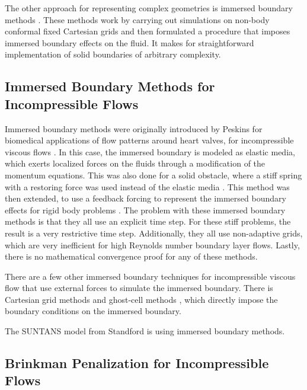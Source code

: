 The other approach for representing complex geometries is immersed boundary methods \cite{02Peskin, 02MI}.  These methods work by carrying out simulations on non-body conformal fixed Cartesian grids and then formulated a procedure that imposes immersed boundary effects on the fluid.  It makes for straightforward implementation of solid boundaries of arbitrary complexity.  
 
\subsection{Immersed Boundary Methods for Incompressible Flows}

Immersed boundary methods were originally introduced by Peskins for biomedical applications of flow patterns around heart valves, for incompressible viscous flows \cite{72Peskin}.    In this case, the immersed boundary is modeled as elastic media, which exerts localized forces on the fluids through a modification of the momentum equations.  This was also done for a solid obstacle, where a stiff spring with a restoring force was used instead of the elastic media \cite{00LP}.  This method was then extended, to use a feedback forcing to represent the immersed boundary effects for rigid body problems \cite{93GHS, 96SB}.  The problem with these immersed boundary methods is that they all use an explicit time step.  For these stiff problems, the result is a very restrictive time step.  Additionally, they all use non-adaptive grids, which are very inefficient for high Reynolds number boundary layer flows.  Lastly, there is no mathematical convergence proof for any of these methods.

There are a few other immersed boundary techniques for incompressible viscous flow that use external forces to simulate the immersed boundary.  There is Cartesian grid methods \cite{79PB, 86CSH, 93ZP, 98BA} and ghost-cell methods \cite{03TF}, which directly impose the boundary conditions on the immersed boundary.  

The SUNTANS model from Standford \cite{06FGS} is using immersed boundary methods. 

\subsection{Brinkman Penalization for Incompressible Flows}

